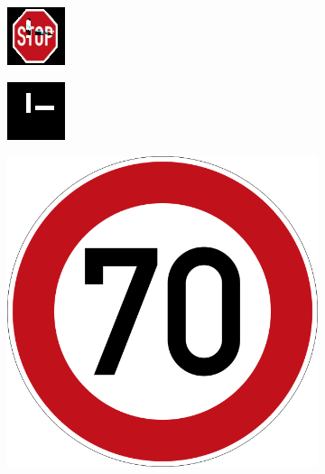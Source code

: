 \begin{figure}
\centering
\begin{subfigure}{.19\linewidth}
  \centering
  \includegraphics[width=0.7\linewidth]{imgs/stopp_to_7}
\end{subfigure}
\begin{subfigure}{.19\linewidth}
  \centering
  \includegraphics[width=0.7\linewidth]{imgs/stop_abstract}
\end{subfigure}
\begin{subfigure}{.19\linewidth}
  \centering
  \includegraphics[width=0.7\linewidth]{imgs/7_real}

\end{subfigure}
\end{figure}
